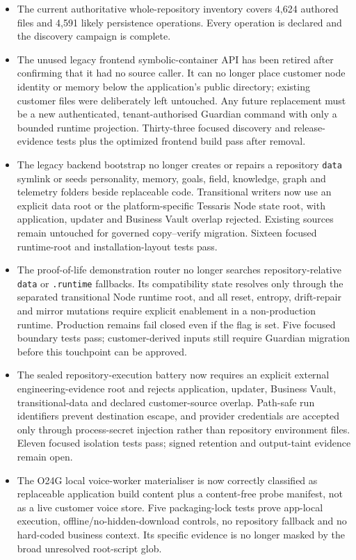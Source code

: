 \documentclass[11pt]{article}
\begin{document}
\begin{itemize}
  \item The current authoritative whole-repository inventory covers 4,624 authored files and 4,591 likely persistence operations. Every operation is declared and the discovery campaign is complete.
  \item The unused legacy frontend symbolic-container API has been retired after confirming that it had no source caller. It can no longer place customer node identity or memory below the application's public directory; existing customer files were deliberately left untouched. Any future replacement must be a new authenticated, tenant-authorised Guardian command with only a bounded runtime projection. Thirty-three focused discovery and release-evidence tests plus the optimized frontend build pass after removal.
  \item The legacy backend bootstrap no longer creates or repairs a repository \texttt{data} symlink or seeds personality, memory, goals, field, knowledge, graph and telemetry folders beside replaceable code. Transitional writers now use an explicit data root or the platform-specific Tessaris Node state root, with application, updater and Business Vault overlap rejected. Existing sources remain untouched for governed copy--verify migration. Sixteen focused runtime-root and installation-layout tests pass.
  \item The proof-of-life demonstration router no longer searches repository-relative \texttt{data} or \texttt{.runtime} fallbacks. Its compatibility state resolves only through the separated transitional Node runtime root, and all reset, entropy, drift-repair and mirror mutations require explicit enablement in a non-production runtime. Production remains fail closed even if the flag is set. Five focused boundary tests pass; customer-derived inputs still require Guardian migration before this touchpoint can be approved.
  \item The sealed repository-execution battery now requires an explicit external engineering-evidence root and rejects application, updater, Business Vault, transitional-data and declared customer-source overlap. Path-safe run identifiers prevent destination escape, and provider credentials are accepted only through process-secret injection rather than repository environment files. Eleven focused isolation tests pass; signed retention and output-taint evidence remain open.
  \item The O24G local voice-worker materialiser is now correctly classified as replaceable application build content plus a content-free probe manifest, not as a live customer voice store. Five packaging-lock tests prove app-local execution, offline/no-hidden-download controls, no repository fallback and no hard-coded business context. Its specific evidence is no longer masked by the broad unresolved root-script glob.

\end{itemize}
\end{document}
